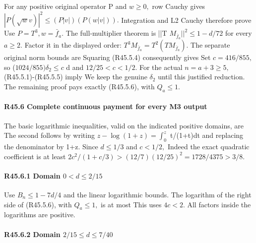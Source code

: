 For any positive original operator P and \(w\ge 0,\allowbreak \) row Cauchy gives
\(|P(\sqrt{w}v)|^2\le (P|v|)(P(w|v|)).\) Integration and L2 Cauchy therefore
prove
Use \(P=T^3,\allowbreak  w=\bar f_a.\) The full-multiplier theorem is
||T \(M_{\bar f_a}||^2\le 1-d/72\) for every \(a\ge 2.\) Factor it in the displayed order:
\(T^3 M_{\bar f_a}=T^2(T M_{\bar f_a}).\) The separate original norm bounds are
Squaring (R45.5.4) consequently gives
Set \(c=416/855,\allowbreak \) so (\(1024/855)\delta_2\le c\) d and \(12/25<c<1/2.\)
For the actual \(n=a+3\ge 5,\allowbreak \) (R45.5.1)-(R45.5.5) imply
We keep the genuine \(\delta_2\) until this justified reduction. The remaining
proof pays exactly (R45.5.6), with \(Q_a\le 1.\)

\paragraph{R45.6 Complete continuous payment for every M3 output}

The basic logarithmic inequalities, valid on the indicated positive
domains, are
The second follows by writing \(z-\log(1+z)=\int _0^z\) t/(1+t)dt
and replacing the denominator by 1+z. Since \(d\le 1/3\) and \(c<1/2,\allowbreak \)
Indeed the exact quadratic coefficient is at least
\(2c^2/(1+c/3)>(12/7)(12/25)^2=1728/4375>3/8.\)

\paragraph{R45.6.1 Domain \(0<d\le 2/15\)}

Use \(B_n\le 1-7d/4\) and the linear logarithmic bounds. The logarithm of
the right side of (R45.5.6), with \(Q_a\le 1,\allowbreak \) is at most
This uses \(4c<2.\) All factors inside the logarithms are positive.

\paragraph{R45.6.2 Domain \(2/15\le d\le 7/40\)}

